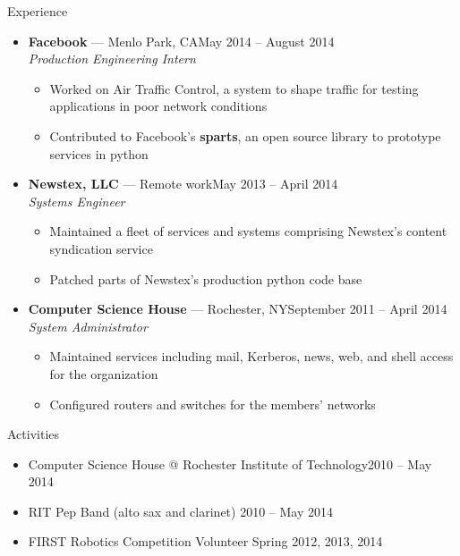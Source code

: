 \documentclass[10pt,oneside]{article}
\newenvironment{ressection}[1]{
	\vspace{3pt}
	{\fontfamily{ppl}\selectfont\Large#1}
	\begin{itemize}
	\vspace{2pt}
}{
	\end{itemize}
}
\newcommand{\resitem}[1]{
	\vspace{-2pt}
	\item \begin{flushleft} #1 \end{flushleft}
}
\newcommand{\ressubitem}[1]{
	\vspace{-1pt}
	\item \begin{flushleft} #1 \end{flushleft}
}
\newcommand{\resbigitem}[3]{
	\vspace{-3pt}
	\item
	\textbf{#1} --- #2 \\
	\textit{#3}
}
\newenvironment{ressubsec}[3]{
	\resbigitem{#1}{#2}{#3}
	\vspace{-1pt}
	\begin{itemize}
}{
	\end{itemize}
}
\begin{document}
\begin{ressection}{Experience}

    \begin{ressubsec}{Facebook}{Menlo Park, CA\hfill May 2014 -- August 2014}{Production Engineering Intern}
        \ressubitem{Worked on Air Traffic Control, a system to shape traffic for testing applications in poor network conditions}
        \ressubitem{Contributed to Facebook's \textbf{sparts}, an open source library to prototype services in python}
    \end{ressubsec}
	\begin{ressubsec}{Newstex, LLC}{Remote work\hfill May 2013 -- April 2014}{Systems Engineer}
		\ressubitem{Maintained a fleet of services and systems comprising Newstex's content syndication service}
		\ressubitem{Patched parts of Newstex's production python code base}
	\end{ressubsec}
	\begin{ressubsec}{Computer Science House}{Rochester, NY\hfill September 2011 -- April 2014}{System Administrator}
		\ressubitem{Maintained services including mail, Kerberos, news, web, and shell access for the organization}
		\ressubitem{Configured routers and switches for the members' networks}
	\end{ressubsec}

\end{ressection}


\begin{ressection}{Activities}

	\resitem{Computer Science House @ Rochester Institute of Technology\hfill 2010 -- May 2014}
	\resitem{RIT Pep Band (alto sax and clarinet) \hfill 2010 -- May 2014}
	\resitem{FIRST Robotics Competition Volunteer \hfill Spring 2012, 2013, 2014}

\end{ressection}
\end{document}
